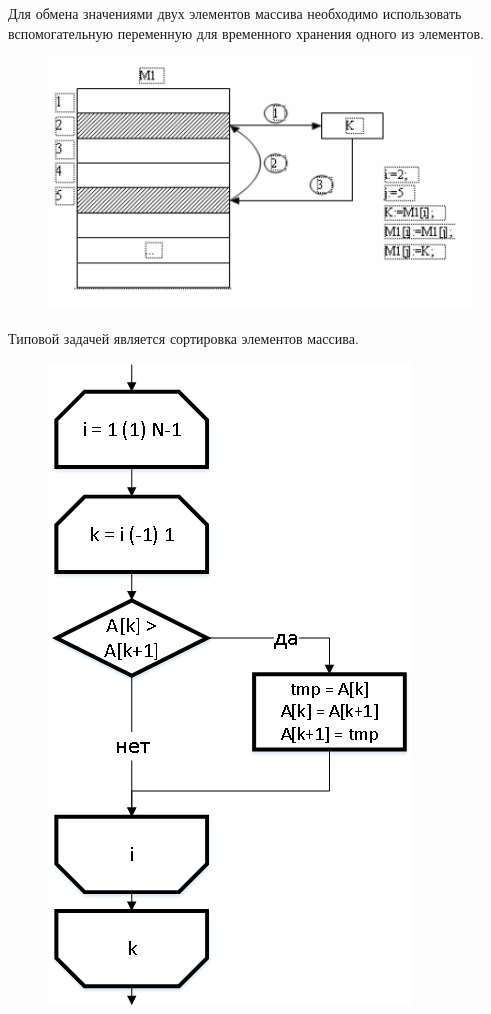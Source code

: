 \documentclass{beamer}
\begin{document}
\begin{frame}
Для обмена значениями двух элементов массива необходимо использовать вспомогательную переменную для временного хранения одного из элементов.
\begin{figure}[h]
\centering
\includegraphics[scale=0.8]{images/array_swap.png}
\label{pic-search-swap}
\end{figure}
\end{frame}

\begin{frame}
Типовой задачей является сортировка элементов массива.
\begin{figure}[h]
\centering
\includegraphics[scale=0.4]{images/array_sort.png}
\label{pic-sort}
\end{figure}
\end{frame}
\end{document}
